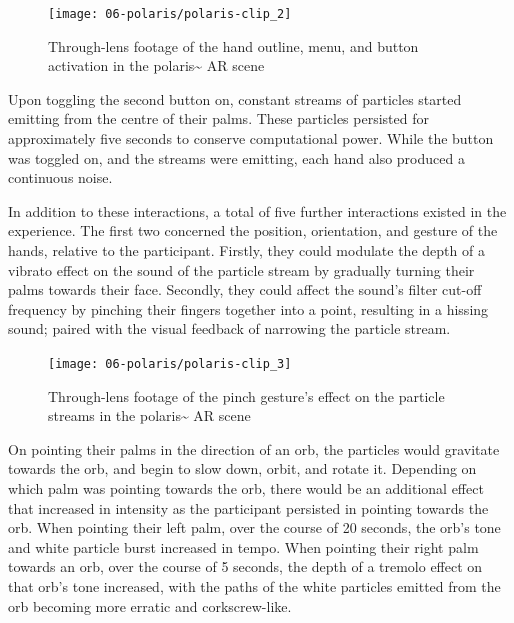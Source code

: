 \begin{figure}[ht]
    \centering
    \texttt{[image: 06-polaris/polaris-clip\_2]}
    \captionsetup{justification=centering,margin=1.5cm}
    \caption{Through-lens footage of the hand outline, menu, and button activation in the polaris\textasciitilde{} AR scene \citep[from][\href{https://youtu.be/lCBgMs8ULj0?t=140}{at 2:20}]{bilbow2022c}}\label{fig: polaris-clip_2}
\end{figure}

Upon toggling the second button on, constant streams of particles started emitting from the centre of their palms. These particles persisted for approximately five seconds to conserve computational power. While the button was toggled on, and the streams were emitting, each hand also produced a continuous noise.

In addition to these interactions, a total of five further interactions existed in the experience. The first two concerned the position, orientation, and gesture of the hands, relative to the participant. Firstly, they could modulate the depth of a vibrato effect on the sound of the particle stream by gradually turning their palms towards their face. Secondly, they could affect the sound's filter cut-off frequency by pinching their fingers together into a point, resulting in a hissing sound; paired with the visual feedback of narrowing the particle stream.

\begin{figure}[ht]
    \centering
    \texttt{[image: 06-polaris/polaris-clip\_3]}
    \captionsetup{justification=centering,margin=1.5cm}
    \caption{Through-lens footage of the pinch gesture’s effect on the particle streams in the polaris\textasciitilde{} AR scene \citep[from][\href{https://youtu.be/lCBgMs8ULj0?t=476}{at 7:56}]{bilbow2022c}}\label{fig: polaris-clip_3}
\end{figure}

On pointing their palms in the direction of an orb, the particles would gravitate towards the orb, and begin to slow down, orbit, and rotate it. Depending on which palm was pointing towards the orb, there would be an additional effect that increased in intensity as the participant persisted in pointing towards the orb. When pointing their left palm, over the course of 20 seconds, the orb's tone and white particle burst increased in tempo. When pointing their right palm towards an orb, over the course of 5 seconds, the depth of a tremolo effect on that orb's tone increased, with the paths of the white particles emitted from the orb becoming more erratic and corkscrew-like.

